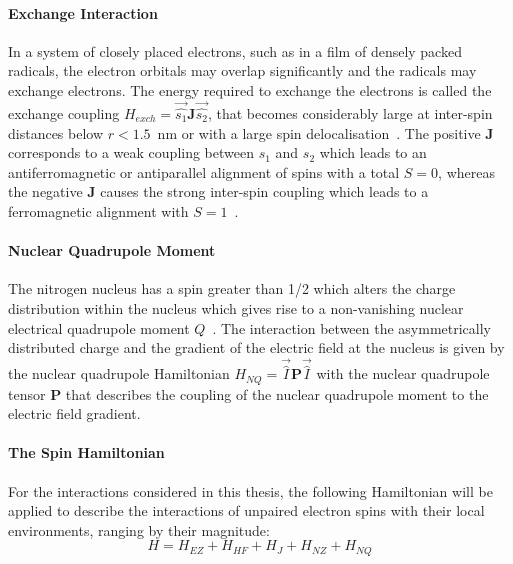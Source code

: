 \paragraph*{Exchange Interaction}
In a system of closely placed electrons, such as in a film of densely packed radicals, the electron orbitals may overlap significantly and the radicals may exchange electrons. The energy required to exchange the electrons is called the exchange coupling $H_{exch} = \vec{\hat{s_1}}\textbf{J}\vec{\hat{s_2}}$, that becomes considerably large at inter-spin distances below $r<1.5$~nm or with a large spin delocalisation~\cite{Schweiger2001_exch}. The positive $\textbf{J}$ corresponds to a weak coupling between $s_1$ and $s_2$ which leads to an antiferromagnetic or antiparallel alignment of spins with a total $S=0$, whereas the negative $\textbf{J}$ causes the strong inter-spin coupling which leads to a ferromagnetic alignment with $S=1$~\cite{Schweiger2001_exch}.\\


\paragraph*{Nuclear Quadrupole Moment}
The nitrogen nucleus has a spin greater than 1/2 which alters the charge distribution within the nucleus which gives rise to a non-vanishing nuclear electrical quadrupole moment $Q$~\cite{Schweiger2001_exch}. The interaction between the asymmetrically distributed charge and the gradient of the electric field at the nucleus is given by the nuclear quadrupole Hamiltonian $H_{NQ}=\vec{\hat{I}}\textbf{P}\vec{\hat{I}}$ with the nuclear quadrupole tensor $\textbf{P}$ that describes the coupling of the nuclear quadrupole moment to the electric field gradient.

\paragraph*{The Spin Hamiltonian}
For the interactions considered in this thesis, the following Hamiltonian will be applied to describe the interactions of unpaired electron spins with their local environments, ranging by their magnitude:
\begin{equation}
H = H_{EZ} + H_{HF} + H_{J} + H_{NZ} + H_{NQ}
\end{equation}

